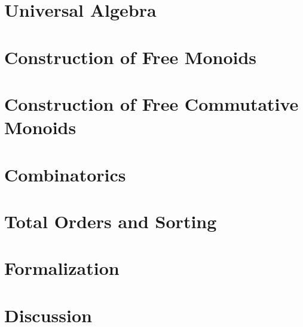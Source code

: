 \documentclass{l4proj}
\begin{document}
\chapter{Universal Algebra}


\chapter{Construction of Free Monoids}


\chapter{Construction of Free Commutative Monoids}


\chapter{Combinatorics}


\chapter{Total Orders and Sorting}


\chapter{Formalization}


\chapter{Discussion}







\end{document}
